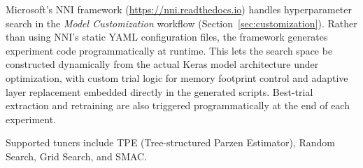 Microsoft's NNI framework (\url{https://nni.readthedocs.io}) handles hyperparameter search in the \textit{Model Customization} workflow (Section~\ref{sec:customization}). Rather than using NNI's static YAML configuration files, the framework generates experiment code programmatically at runtime. This lets the search space be constructed dynamically from the actual Keras model architecture under optimization, with custom trial logic for memory footprint control and adaptive layer replacement embedded directly in the generated scripts. Best-trial extraction and retraining are also triggered programmatically at the end of each experiment.

Supported tuners include TPE (Tree-structured Parzen Estimator), Random Search, Grid Search, and SMAC.
